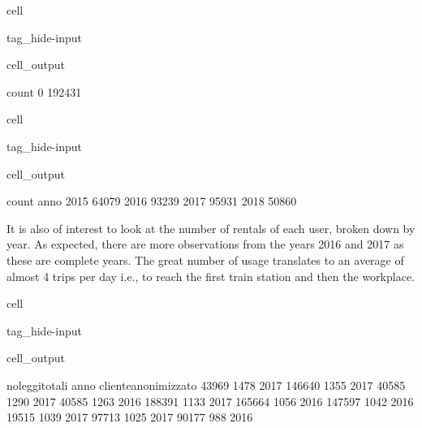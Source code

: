 \documentclass[letterpaper,10pt,english]{jupyterBook}
\begin{document}
\begin{sphinxuseclass}{cell}
\begin{sphinxuseclass}{tag_hide-input}
\begin{sphinxuseclass}{cell_output}
\begin{sphinxVerbatim}[commandchars=\\\{\}]
    count
0  192431
\end{sphinxVerbatim}

\end{sphinxuseclass}
\end{sphinxuseclass}
\end{sphinxuseclass}
\begin{sphinxuseclass}{cell}
\begin{sphinxuseclass}{tag_hide-input}
\begin{sphinxuseclass}{cell_output}
\begin{sphinxVerbatim}[commandchars=\\\{\}]
      count
anno       
2015  64079
2016  93239
2017  95931
2018  50860
\end{sphinxVerbatim}

\end{sphinxuseclass}
\end{sphinxuseclass}
\end{sphinxuseclass}
\sphinxAtStartPar
It is also of interest to look at the number of rentals of each user, broken down by year. As expected, there are more observations from the years 2016 and 2017 as these are complete years. The great number of usage translates to an average of almost 4 trips per day \sphinxhyphen{} i.e., to reach the first train station and then the workplace.

\begin{sphinxuseclass}{cell}
\begin{sphinxuseclass}{tag_hide-input}
\begin{sphinxuseclass}{cell_output}
\begin{sphinxVerbatim}[commandchars=\\\{\}]
                      noleggi\PYGZus{}totali  anno
cliente\PYGZus{}anonimizzato                      
43969                           1478  2017
146640                          1355  2017
40585                           1290  2017
40585                           1263  2016
188391                          1133  2017
165664                          1056  2016
147597                          1042  2016
19515                           1039  2017
97713                           1025  2017
90177                            988  2016
\end{sphinxVerbatim}

\end{sphinxuseclass}
\end{sphinxuseclass}
\end{sphinxuseclass}
\end{document}
